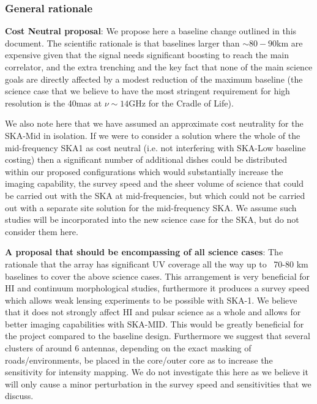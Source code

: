 \documentclass[sfheadings,a4paper,times,9pt,floats,floatfix]{article}
\begin{document}
\subsubsection{General rationale}

{\bf Cost Neutral proposal}: We propose here a baseline change outlined in this document. The scientific rationale is that
baselines larger than $\sim 80-90$km are expensive given that the signal needs significant boosting to
reach the main correlator, and the extra trenching and the key fact
that none of the main science goals are directly
affected by a modest reduction of the maximum baseline (the 
science case that we believe to have the most stringent requirement
for high resolution is the 40mas at $\nu\sim 14$GHz for the Cradle of Life). 

We also note here that we have assumed an approximate cost neutrality
for the SKA-Mid in isolation. If we were to consider a solution where the whole of the
mid-frequency SKA1 as cost neutral (i.e. not interfering with
SKA-Low baseline costing) then a significant number of additional dishes could be distributed
within our proposed configurations which would substantially increase the imaging
capability, the survey speed and the sheer volume of science that
could be carried out with the SKA at mid-frequencies, but which could
not be carried out with a separate site solution for the mid-frequency SKA. We
assume such studies will be incorporated into the new science case for
the SKA, but do not consider them here.

{\bf A proposal that should be encompassing of all science cases}: The rationale that the array
has significant UV coverage all the way up to ~70-80 km baselines to cover the above
science cases. This arrangement is very beneficial for HI and continuum morphological studies,
furthermore it produces a survey speed which allows weak lensing experiments to be
possible with SKA-1. We believe that it does not strongly affect HI and pulsar science as a whole and allows for
better imaging capabilities with SKA-MID. This would be greatly beneficial for the project
compared to the baseline design. Furthermore we suggest that several clusters of around 6
antennas, depending on the exact masking of roads/environments, be placed in the core/outer
core as to increase the sensitivity for intensity mapping. We do not
investigate this here as we believe it will only cause a minor perturbation in
the survey speed and sensitivities that we discuss.
\end{document}
